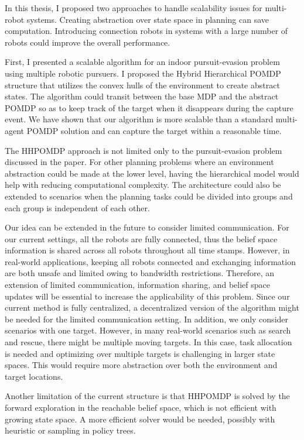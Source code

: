 \documentclass[../main.tex]{subfiles}
\begin{document}
In this thesis, I proposed two approaches to handle scalability issues for multi-robot systems. Creating abstraction over state space in planning can save computation. Introducing connection robots in systems with a large number of robots could improve the overall performance.

First, I presented a scalable algorithm for an indoor pursuit-evasion problem using multiple robotic pursuers. I proposed the Hybrid Hierarchical POMDP structure that utilizes the convex hulls of the environment to create abstract states. The algorithm could transit between the base MDP and the abstract POMDP so as to keep track of the target when it disappears during the capture event. We have shown that our algorithm is more scalable than a standard multi-agent POMDP solution and can capture the target within a reasonable time.

The HHPOMDP approach is not limited only to the pursuit-evasion problem discussed in the paper. For other planning problems where an environment abstraction could be made at the lower level, having the hierarchical model would help with reducing computational complexity. The architecture could also be extended to scenarios when the planning tasks could be divided into groups and each group is independent of each other.

Our idea can be extended in the future to consider limited communication. For our current settings, all the robots are fully connected, thus the belief space information is shared across all robots throughout all time stamps. However, in real-world applications, keeping all robots connected and exchanging information are both unsafe and limited owing to bandwidth restrictions. Therefore, an extension of limited communication, information sharing, and belief space updates will be essential to increase the applicability of this problem. Since our current method is fully centralized, a decentralized version of the algorithm might be needed for the limited communication setting. In addition, we only consider scenarios with one target. However, in many real-world scenarios such as search and rescue, there might be multiple moving targets. In this case, task allocation is needed and optimizing over multiple targets is challenging in larger state spaces. This would require more abstraction over both the environment and target locations.  

Another limitation of the current structure is that HHPOMDP is solved by the forward exploration in the reachable belief space, which is not efficient with growing state space. A more efficient solver would be needed, possibly with heuristic or sampling in policy trees.
\end{document}
